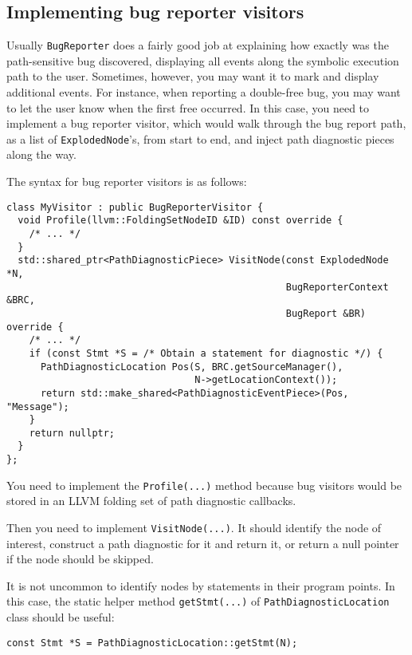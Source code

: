 \documentclass[a4paper,12pt]{article}
\newenvironment{nobr}{\begin{minipage}{\textwidth}\setlength\parskip{1em}
}{\end{minipage}\ignorespacesafterend}
\begin{document}
\subsection{Implementing bug reporter visitors}\label{subsec:bug_visitors}

Usually \lstinline|BugReporter| does a fairly good job at explaining how exactly was the path-sensitive bug discovered, displaying all events along the symbolic execution path to the user. Sometimes, however, you may want it to mark and display additional events. For instance, when reporting a double-free bug, you may want to let the user know when the first free occurred. In this case, you need to implement a bug reporter visitor, which would walk through the bug report path, as a list of \lstinline|ExplodedNode|'s, from start to end, and inject path diagnostic pieces along the way.

\begin{nobr}
The syntax for bug reporter visitors is as follows:
\begin{lstlisting}[style=cplusplus]
class MyVisitor : public BugReporterVisitor {
  void Profile(llvm::FoldingSetNodeID &ID) const override {
    /* ... */
  }
  std::shared_ptr<PathDiagnosticPiece> VisitNode(const ExplodedNode *N,
                                                 BugReporterContext &BRC,
                                                 BugReport &BR) override {
    /* ... */
    if (const Stmt *S = /* Obtain a statement for diagnostic */) {
      PathDiagnosticLocation Pos(S, BRC.getSourceManager(),
                                 N->getLocationContext());
      return std::make_shared<PathDiagnosticEventPiece>(Pos, "Message");
    }
    return nullptr;
  }
};
\end{lstlisting}
\end{nobr}

You need to implement the \lstinline|Profile(...)| method because bug visitors would be stored in an LLVM folding set of path diagnostic callbacks.

Then you need to implement \lstinline|VisitNode(...)|. It should identify the node of interest, construct a path diagnostic for it and return it, or return a null pointer if the node should be skipped.

\begin{nobr}
It is not uncommon to identify nodes by statements in their program points. In this case, the static helper method \lstinline|getStmt(...)| of \lstinline{PathDiagnosticLocation} class should be useful:

\begin{lstlisting}[style=cplusplus,numbers=none]
const Stmt *S = PathDiagnosticLocation::getStmt(N);
\end{lstlisting}
\end{nobr}
\end{document}

